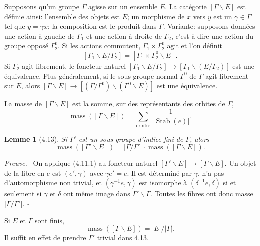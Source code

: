 \documentclass[10pt]{article}
\newcommand{\mass}{\operatorname{mass}}
\theoremstyle{deligne}
\newtheorem*{lemma*}{Lemme}
\newenvironment{proofdel}[1][Preuve.]{\textit{#1}\ }{\hfill$\square$}
\newcommand{\Stab}{\operatorname{Stab}}
\newcommand{\heading}[1]{\vspace{0.7em}\noindent{\bfseries #1}\quad}
\begin{document}
\heading{4.12.} Supposons qu'un groupe $\Gamma$ agisse sur un ensemble $E$. La catégorie $[\Gamma\backslash E]$ est définie ainsi: l'ensemble des objets est $E$; un morphisme de $x$ vers $y$ est un $\gamma\in\Gamma$ tel que $y=\gamma x$; la composition est le produit dans $\Gamma$. Variante: supposons données une action à gauche de $\Gamma_1$ et une action à droite de $\Gamma_2$, c'est-à-dire une action du groupe opposé $\Gamma_2^0$. Si les actions commutent, $\Gamma_1\times\Gamma_2^0$ agit et l'on définit
\[
[\Gamma_1\backslash E/\Gamma_2]=[\Gamma_1\times\Gamma_2^0\backslash E].
\]
Si $\Gamma_2$ agit librement, le foncteur naturel $[\Gamma_1\backslash E/\Gamma_2]\to[\Gamma_1\backslash(E/\Gamma_2)]$ est une équivalence. Plus généralement, si le sous-groupe normal $\Gamma^0$ de $\Gamma$ agit librement sur $E$, alors $[\Gamma\backslash E]\to[(\Gamma/\Gamma^0)\backslash(\Gamma^0\backslash E)]$ est une équivalence.

La masse de $[\Gamma\backslash E]$ est la somme, sur des représentants des orbites de $\Gamma$,
\begin{equation}\tag{4.12.1}
\mass([\Gamma\backslash E])=\sum_{\mathrm{orbites}}\frac1{|\Stab(e)|}.
\end{equation}

\begin{lemma*}[4.13]
Si $\Gamma'$ est un sous-groupe d'indice fini de $\Gamma$, alors
\begin{equation}\tag{4.13.1}
\mass([\Gamma'\backslash E])=|\Gamma/\Gamma'|\cdot\mass([\Gamma\backslash E]).
\end{equation}
\end{lemma*}

\begin{proofdel}[Preuve.]
On applique (4.11.1) au foncteur naturel $[\Gamma'\backslash E]\to[\Gamma\backslash E]$. Un objet de la fibre en $e$ est $(e',\gamma)$ avec $\gamma e'=e$. Il est déterminé par $\gamma$, n'a pas d'automorphisme non trivial, et $(\gamma^{-1}e,\gamma)$ est isomorphe à $(\delta^{-1}e,\delta)$ si et seulement si $\gamma$ et $\delta$ ont même image dans $\Gamma'\backslash\Gamma$. Toutes les fibres ont donc masse $|\Gamma/\Gamma'|$.
\end{proofdel}

\heading{Exemple 4.14.} Si $E$ et $\Gamma$ sont finis,
\begin{equation}\tag{4.14.1}
\mass([\Gamma\backslash E])=|E|/|\Gamma|.
\end{equation}
Il suffit en effet de prendre $\Gamma'$ trivial dans 4.13.
\end{document}
